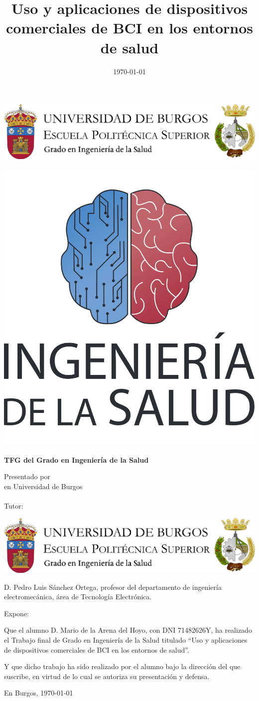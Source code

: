 \documentclass[a4paper,12pt,twoside]{memoir}
\title{Uso y aplicaciones de dispositivos comerciales de BCI en los entornos de salud}
\author{\nombre}
\date{\today}
\makeatletter
\def\maketitle{
  \null
  \thispagestyle{empty}
\begin{center}
  \noindent\includegraphics[width=\textwidth]{cabeceraSalud}\vspace{1.5cm}%
\end{center}
  
  \begin{center}
    \begin{minipage}[c][1.5cm][c]{.20\textwidth}
        \includegraphics[width=\textwidth]{escudoSalud.pdf}
    \end{minipage}
  \end{center}
  
  \begin{center}
    \colorbox{cpardoBox}{%
        \begin{minipage}{.8\textwidth}
          \vspace{.5cm}\Large
          \begin{center}
          \textbf{TFG del Grado en Ingeniería de la Salud}\vspace{.6cm}\\
          \textbf{\LARGE\@title{}}
          \end{center}
          \vspace{.2cm}
        \end{minipage}
    }%
  \end{center}
  
  \begin{center}%
  {%
    \noindent\LARGE
    Presentado por \@author{}\\ 
    en Universidad de Burgos\\
    \vspace{0.5cm}
    \noindent\Large
    \@date{}\\
    \vspace{0.5cm}
    Tutor: \@tutor{}\\ %
  }%
  \end{center}%
  \null
  \cleardoublepage
  }
\newcommand{\nombre}{Mario de la Arena del Hoyo}
\newcommand{\nombreTutor}{Pedro Luis Sánchez Ortega}
\newcommand{\nombreTutorb}{Tutor 2}
\newcommand{\dni}{71482626Y}
\makeatother
\begin{document}
\maketitle


\newpage\null\thispagestyle{empty}\newpage

\thispagestyle{empty}


\noindent\includegraphics[width=\textwidth]{cabeceraSalud}\vspace{1cm}

\noindent D. \nombreTutor, profesor del departamento de ingeniería electromecánica,
área de Tecnología Electrónica.

\noindent Expone:

\noindent Que el alumno D. \nombre, con DNI \dni, ha realizado el Trabajo final de Grado en Ingeniería de la Salud titulado ``Uso y aplicaciones de dispositivos comerciales de BCI en los entornos de salud''. 

\noindent Y que dicho trabajo ha sido realizado por el alumno bajo la dirección del que suscribe, en virtud de lo cual se autoriza su presentación y defensa.

\begin{center} %
En Burgos, {\large \today}
\end{center}

\vfill\vfill\vfill


\end{document}
